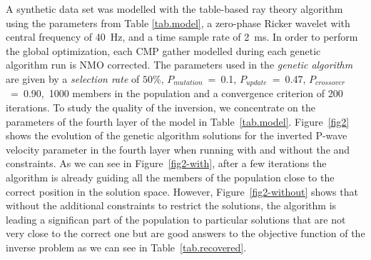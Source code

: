 \documentclass{vie16}
\begin{document}
\vspace{-0.4cm}
A synthetic data set was modelled with the table-based ray theory
algorithm using the parameters from Table \ref{tab.model},
a zero-phase Ricker wavelet with central frequency of 40~Hz, and a time
sample rate of 2~ms. In order to perform the global optimization, each
CMP gather modelled during each genetic algorithm run is NMO corrected.
The parameters used in the \textit{genetic algorithm} are given
by a \textit{selection rate} of $50\%$, $P_{mutation}$~=~0.1,
$P_{update}$~=~0.47, $P_{crossover}$~=~0.90,~1000 members in the
population and a convergence criterion of 200 iterations. To study the quality of the inversion, we concentrate on the
parameters of the fourth
layer of the model in Table~\ref{tab.model}.
Figure~\ref{fig2} shows the evolution of the genetic
algorithm solutions for the inverted P-wave velocity parameter in the
fourth layer when running with and without the
\cite{Gardner1974} and \cite{Castagna1985} constraints. As we
can see in Figure~\ref{fig2-with}, after a few iterations the
algorithm is already guiding all the members of the population
close to the correct position in the solution space.
However, Figure~\ref{fig2-without} shows that without the
additional constraints to restrict the solutions, the
algorithm is leading a significan part of the population to particular solutions
that are not very close to the correct one but are good answers
to the objective function of the inverse problem as we can see in
Table~\ref{tab.recovered}.
\end{document}
